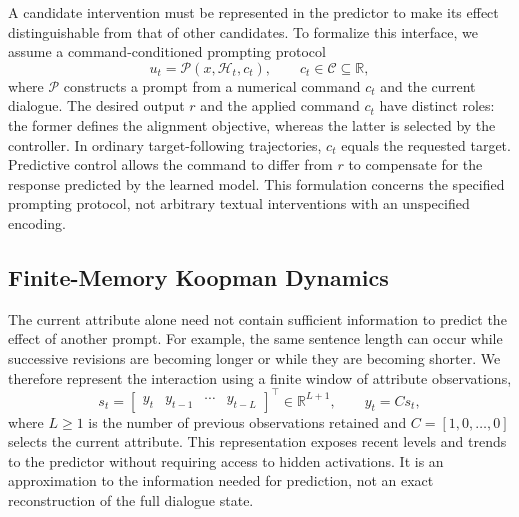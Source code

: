 A candidate intervention must be represented in the predictor to make
its effect distinguishable from that of other candidates. To formalize
this interface, we assume a command-conditioned prompting protocol
\begin{equation}
    u_t=\mathcal{P}(x,\mathcal{H}_t,c_t),
    \qquad
    c_t\in\mathcal{C}\subseteq\mathbb{R},
    \label{eq:prompt_protocol}
\end{equation}
where $\mathcal{P}$ constructs a prompt from a numerical command $c_t$
and the current dialogue. The desired output $r$ and the applied
command $c_t$ have distinct roles: the former defines the alignment
objective, whereas the latter is selected by the controller. In
ordinary target-following trajectories, $c_t$ equals the requested
target. Predictive control allows the command to differ from $r$ to
compensate for the response predicted by the learned model. This
formulation concerns the specified prompting protocol, not arbitrary
textual interventions with an unspecified encoding.

\subsection{Finite-Memory Koopman Dynamics}
\label{sec:memory_koopman}

The current attribute alone need not contain sufficient information to
predict the effect of another prompt. For example, the same sentence
length can occur while successive revisions are becoming longer or
while they are becoming shorter. We therefore represent the interaction
using a finite window of attribute observations,
\begin{equation}
    s_t=
    \begin{bmatrix}
        y_t & y_{t-1} & \cdots & y_{t-L}
    \end{bmatrix}^{\top}
    \in\mathbb{R}^{L+1},
    \qquad
    y_t=C s_t,
    \label{eq:memory_state}
\end{equation}
where $L\geq 1$ is the number of previous observations retained and
$C=[1,0,\ldots,0]$ selects the current attribute. This representation
exposes recent levels and trends to the predictor without requiring
access to hidden activations. It is an approximation to the information
needed for prediction, not an exact reconstruction of the full dialogue
state.

